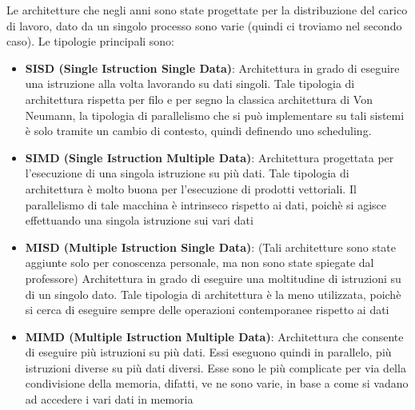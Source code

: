 Le architetture che negli anni sono state progettate per la distribuzione del carico di lavoro, dato da un singolo processo sono varie (quindi ci troviamo nel secondo caso).
Le tipologie principali sono:
\begin{itemize}
    \item \textbf{SISD (Single Istruction Single Data)}: Architettura in grado di eseguire una istruzione alla volta lavorando su dati singoli. Tale tipologia di architettura rispetta per filo e per segno la classica architettura di Von Neumann, la tipologia di parallelismo che si può implementare su tali sistemi è solo tramite un cambio di contesto, quindi definendo uno scheduling.
    \item \textbf{SIMD (Single Istruction Multiple Data)}: Architettura progettata per l'esecuzione di una singola istruzione su più dati. Tale tipologia di architettura è molto buona per l'esecuzione di prodotti vettoriali. Il parallelismo di tale macchina è intrinseco rispetto ai dati, poichè si agisce effettuando una singola istruzione sui vari dati
    \item \textbf{MISD (Multiple Istruction Single Data)}: (Tali architetture sono state aggiunte solo per conoscenza personale, ma non sono state spiegate dal professore) Architettura in grado di eseguire una moltitudine di istruzioni su di un singolo dato. Tale tipologia di architettura è la meno utilizzata, poichè si cerca di eseguire sempre delle operazioni contemporanee rispetto ai dati
    \item \textbf{MIMD (Multiple Istruction Multiple Data)}: Architettura che consente di eseguire più istruzioni su più dati. Essi eseguono quindi in parallelo, più istruzioni diverse su più dati diversi. Esse sono le più complicate per via della condivisione della memoria, difatti, ve ne sono varie, in base a come si vadano ad accedere i vari dati in memoria
\end{itemize}


